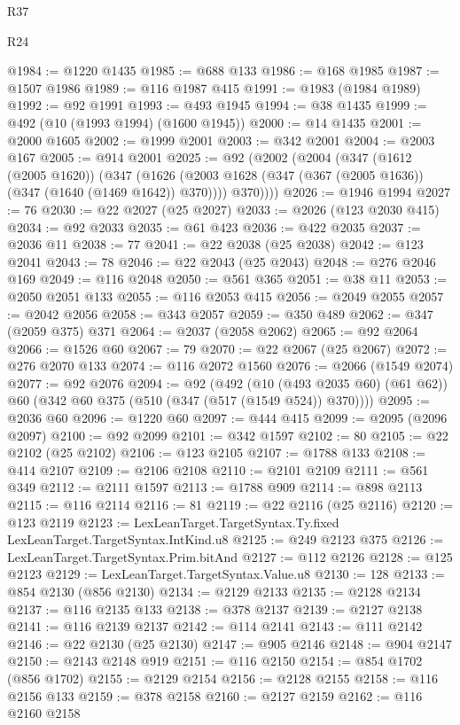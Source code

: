 \begin{lexlean}{R37}
\begin{lexlean}{R24}
\begin{coremodule}
{{{{{{{{{{{{{{{{{{{{{{{{{{{{{{{{{{{{{{{{{{{{{{{{{{{{{{{{{{{{{{{{{{{{{{{{{{{{{{{{{{{{{{{{{{{{{{{{{{{{{{{{{{{{{{{{{{{{{{{{{{{{{{{{{{{{{{{{{{{{{{{{{{{{{{{{{{{{{{{{{{{{{{{{{{{{{{{{{{{{{{{{{@1984 := @1220 @1435
@1985 := @688 @133
@1986 := @168 @1985
@1987 := @1507 @1986
@1989 := @116 @1987 @415
@1991 := @1983 (@1984 @1989)
@1992 := @92 @1991
@1993 := @493 @1945
@1994 := @38 @1435
@1999 := @492 (@10 (@1993 @1994) (@1600 @1945))
@2000 := @14 @1435
@2001 := @2000 @1605
@2002 := @1999 @2001
@2003 := @342 @2001
@2004 := @2003 @167
@2005 := @914 @2001
@2025 := @92
    (@2002
      (@2004
        (@347
          (@1612 (@2005 @1620))
          (@347
            (@1626 (@2003 @1628 (@347 (@367 (@2005 @1636)) (@347 (@1640 (@1469 @1642)) @370))))
            @370))))
@2026 := @1946 @1994
@2027 := 76
@2030 := @22 @2027 (@25 @2027)
@2033 := @2026 (@123 @2030 @415)
@2034 := @92 @2033
@2035 := @61 @423
@2036 := @422 @2035
@2037 := @2036 @11
@2038 := 77
@2041 := @22 @2038 (@25 @2038)
@2042 := @123 @2041
@2043 := 78
@2046 := @22 @2043 (@25 @2043)
@2048 := @276 @2046 @169
@2049 := @116 @2048
@2050 := @561 @365
@2051 := @38 @11
@2053 := @2050 @2051 @133
@2055 := @116 @2053 @415
@2056 := @2049 @2055
@2057 := @2042 @2056
@2058 := @343 @2057
@2059 := @350 @489
@2062 := @347 (@2059 @375) @371
@2064 := @2037 (@2058 @2062)
@2065 := @92 @2064
@2066 := @1526 @60
@2067 := 79
@2070 := @22 @2067 (@25 @2067)
@2072 := @276 @2070 @133
@2074 := @116 @2072 @1560
@2076 := @2066 (@1549 @2074)
@2077 := @92 @2076
@2094 := @92
    (@492
      (@10 (@493 @2035 @60) (@61 @62))
      @60
      (@342 @60 @375 (@510 (@347 (@517 (@1549 @524)) @370))))
@2095 := @2036 @60
@2096 := @1220 @60
@2097 := @444 @415
@2099 := @2095 (@2096 @2097)
@2100 := @92 @2099
@2101 := @342 @1597
@2102 := 80
@2105 := @22 @2102 (@25 @2102)
@2106 := @123 @2105
@2107 := @1788 @133
@2108 := @414 @2107
@2109 := @2106 @2108
@2110 := @2101 @2109
@2111 := @561 @349
@2112 := @2111 @1597
@2113 := @1788 @909
@2114 := @898 @2113
@2115 := @116 @2114
@2116 := 81
@2119 := @22 @2116 (@25 @2116)
@2120 := @123 @2119
@2123 := LexLeanTarget.TargetSyntax.Ty.fixed LexLeanTarget.TargetSyntax.IntKind.u8
@2125 := @249 @2123 @375
@2126 := LexLeanTarget.TargetSyntax.Prim.bitAnd
@2127 := @112 @2126
@2128 := @125 @2123
@2129 := LexLeanTarget.TargetSyntax.Value.u8
@2130 := 128
@2133 := @854 @2130 (@856 @2130)
@2134 := @2129 @2133
@2135 := @2128 @2134
@2137 := @116 @2135 @133
@2138 := @378 @2137
@2139 := @2127 @2138
@2141 := @116 @2139 @2137
@2142 := @114 @2141
@2143 := @111 @2142
@2146 := @22 @2130 (@25 @2130)
@2147 := @905 @2146
@2148 := @904 @2147
@2150 := @2143 @2148 @919
@2151 := @116 @2150
@2154 := @854 @1702 (@856 @1702)
@2155 := @2129 @2154
@2156 := @2128 @2155
@2158 := @116 @2156 @133
@2159 := @378 @2158
@2160 := @2127 @2159
@2162 := @116 @2160 @2158
}}}}}}}}}}}}}}}}}}}}}}}}}}}}}}}}}}}}}}}}}}}}}}}}}}}}}}}}}}}}}}}}}}}}}}}}}}}}}}}}}}}}}}}}}}}}}}}}}}}}}}}}}}}}}}}}}}}}}}}}}}}}}}}}}}}}}}}}}}}}}}}}}}}}}}}}}}}}}}}}}}}}}}}}}}}}}}}}}}}}}}}}}
\end{coremodule}
\end{lexlean}
\end{lexlean}
